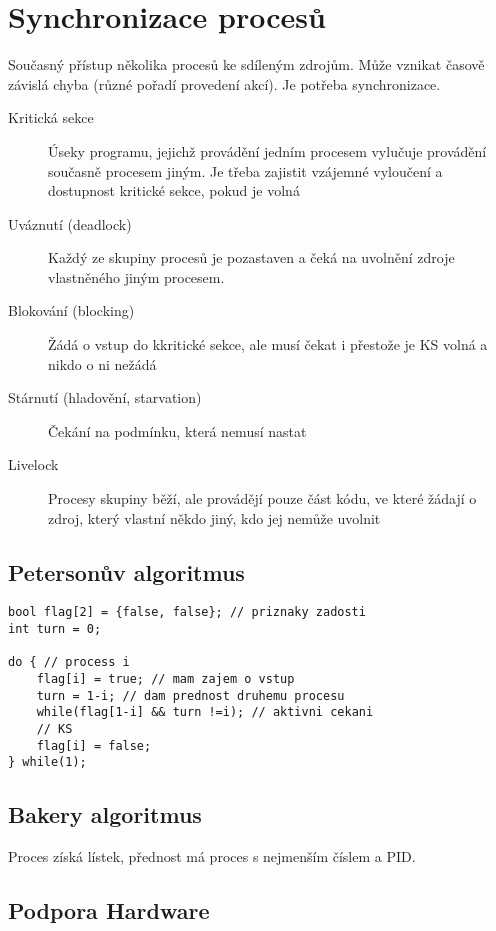 \documentclass[a4wide]{report}
\begin{document}
\section{Synchronizace procesů}

Současný přístup několika procesů ke sdíleným zdrojům. Může vznikat časově závislá chyba (různé pořadí provedení akcí). Je potřeba synchronizace.

\begin{description}
	\item[Kritická sekce] Úseky programu, jejichž provádění jedním procesem vylučuje provádění současně procesem jiným. Je třeba zajistit vzájemné vyloučení a dostupnost kritické sekce, pokud je volná
	\item[Uváznutí (deadlock)] Každý ze skupiny procesů je pozastaven a čeká na uvolnění zdroje vlastněného jiným procesem.
	\item[Blokování (blocking)] Žádá o vstup do kkritické sekce, ale musí čekat i přestože je KS volná a nikdo o ni nežádá
	\item[Stárnutí (hladovění, starvation)] Čekání na podmínku, která nemusí nastat
	\item[Livelock] Procesy skupiny běží, ale provádějí pouze část kódu, ve které žádají o zdroj, který vlastní někdo jiný, kdo jej nemůže uvolnit
\end{description}

\subsection{Petersonův algoritmus}

\begin{lstlisting}
bool flag[2] = {false, false}; // priznaky zadosti
int turn = 0;

do { // process i
	flag[i] = true; // mam zajem o vstup
	turn = 1-i; // dam prednost druhemu procesu
	while(flag[1-i] && turn !=i); // aktivni cekani
	// KS
	flag[i] = false;
} while(1);
\end{lstlisting}

\subsection{Bakery algoritmus}

Proces získá lístek, přednost má proces s nejmenším číslem a PID.

\subsection{Podpora Hardware}
\end{document}
